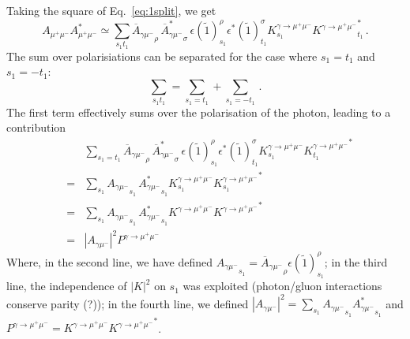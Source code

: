\documentclass[a4paper,10pt]{article}
\begin{document}
Taking the square of Eq.~\ref{eq:1split}, we get
\begin{equation}
    A_{\mu^+ \mu^-} A_{\mu^+ \mu^-}^* \simeq 
    \sum_{s_1 t_1} {\overline A_{\gamma \mu^-} }_\rho\,  {\overline A^*_{\gamma \mu^-} }_\sigma 
    \, \epsilon(\tilde 1)^\rho_{s_1}  \epsilon^*(\tilde 1)^\sigma_{t_1} K^{\gamma\to\mu^+\mu^-}_{s_1} {K^{\gamma\to\mu^+\mu^-}}^*_{t_1}\,.
\end{equation}
The sum over polarisiations can be separated for the case where $s_1 = t_1$ and  $s_1 =- t_1$:
\begin{equation}
 \sum_{s_1 t_1} =  \sum_{s_1= t_1} + \sum_{s_1=-t_1}\,.
\end{equation}
The first term effectively sums over the polarisation of the photon, leading to a contribution
\begin{eqnarray}
   && \sum_{s_1=t_1} {\overline A_{\gamma \mu^-} }_\rho\,  {\overline A^*_{\gamma \mu^-} }_\sigma 
    \, \epsilon(\tilde 1)^\rho_{s_1}  \epsilon^*(\tilde 1)^\sigma_{t_1} K^{\gamma\to\mu^+\mu^-}_{s_1} {K^{\gamma\to\mu^+\mu^-}_{t_1}}^*\\
    &=& \sum_{s_1}{A_{\gamma \mu^-} }_{s_1}\,  {A^*_{\gamma \mu^-} }_{s_1}  K^{\gamma\to\mu^+\mu^-}_{s_1}  {K^{\gamma\to\mu^+\mu^-}_{s_1}}^*\\
    &=&\sum_{s_1}{A_{\gamma \mu^-} }_{s_1}\,  {A^*_{\gamma \mu^-} }_{s_1}  K^{\gamma\to\mu^+\mu^-}  {K^{\gamma\to\mu^+\mu^-}}^*\\
    &=& |A_{\gamma \mu^-} |^2 P^{\gamma\to\mu^+\mu^-} 
\end{eqnarray}
Where, in the second line, we have defined ${A_{\gamma \mu^-} }_{s_1} = {\overline A_{\gamma \mu^-} }_\rho\epsilon(\tilde 1)^\rho_{s_1}$;
in the third line, the independence of $|K|^2$ on $s_1$ was exploited (photon/gluon interactions conserve parity (?));
in the fourth line, we defined $|A_{\gamma \mu^-} |^2=\sum_{s_1}{A_{\gamma \mu^-} }_{s_1} {A^*_{\gamma \mu^-} }_{s_1} $
and $  P^{\gamma\to\mu^+\mu^-} =  K^{\gamma\to\mu^+\mu^-}  {K^{\gamma\to\mu^+\mu^-}}^*$.
\end{document}
